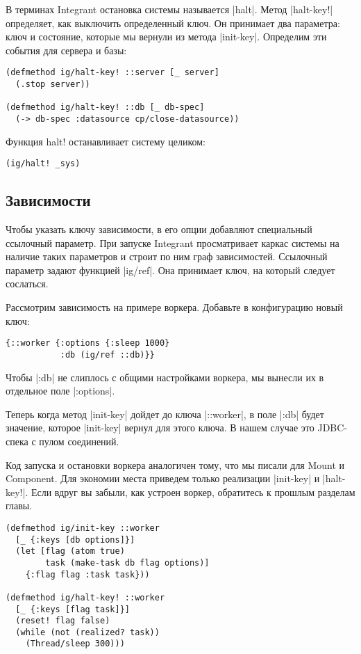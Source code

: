 В терминах Integrant остановка системы называется \spverb|halt|. Метод \spverb|halt-key!|
определяет, как выключить определенный ключ. Он принимает два параметра: ключ и
состояние, которые мы вернули из метода \spverb|init-key|. Определим эти события для
сервера и базы:

\begin{verbatim}
(defmethod ig/halt-key! ::server [_ server]
  (.stop server))

(defmethod ig/halt-key! ::db [_ db-spec]
  (-> db-spec :datasource cp/close-datasource))
\end{verbatim}

Функция halt! останавливает систему целиком:

\begin{verbatim}
(ig/halt! _sys)
\end{verbatim}

\subsection{Зависимости}

Чтобы указать ключу зависимости, в его опции добавляют специальный ссылочный
параметр. При запуске Integrant просматривает каркас системы на наличие таких
параметров и строит по ним граф зависимостей. Ссылочный параметр задают функцией
\spverb|ig/ref|. Она принимает ключ, на который следует сослаться.

Рассмотрим зависимость на примере воркера. Добавьте в конфигурацию новый ключ:

\begin{verbatim}
{::worker {:options {:sleep 1000}
           :db (ig/ref ::db)}}
\end{verbatim}

Чтобы \spverb|:db| не слиплось с общими настройками воркера, мы вынесли их в отдельное
поле \spverb|:options|.

Теперь когда метод \spverb|init-key| дойдет до ключа \spverb|::worker|, в поле \spverb|:db| будет
значение, которое \spverb|init-key| вернул для этого ключа. В нашем случае это
JDBC-спека с пулом соединений.

Код запуска и остановки воркера аналогичен тому, что мы писали для Mount и
Component. Для экономии места приведем только реализации \spverb|init-key| и
\spverb|halt-key!|. Если вдруг вы забыли, как устроен воркер, обратитесь к прошлым
разделам главы.

\begin{verbatim}
(defmethod ig/init-key ::worker
  [_ {:keys [db options]}]
  (let [flag (atom true)
        task (make-task db flag options)]
    {:flag flag :task task}))

(defmethod ig/halt-key! ::worker
  [_ {:keys [flag task]}]
  (reset! flag false)
  (while (not (realized? task))
    (Thread/sleep 300)))
\end{verbatim}

